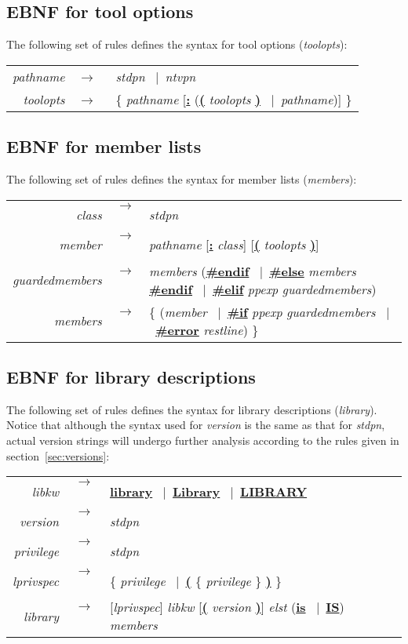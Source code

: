 \documentclass[titlepage,letterpaper]{article}
\newcommand{\nt}[1]{{\it #1}}
\newcommand{\tl}[1]{{\underline{\bf #1}}}
\newcommand{\ar}{$\rightarrow$\ }
\newcommand{\vb}{~$|$~}
\begin{document}
\subsection{EBNF for tool options}

The following set of rules defines the syntax for tool options
(\nt{toolopts}):

\begin{tabular}{rcl}
\nt{pathname} &\ar& \nt{stdpn} \vb \nt{ntvpn} \\
\nt{toolopts} &\ar& \{ \nt{pathname} [\tl{:} (\tl{(} \nt{toolopts} \tl{)} \vb \nt{pathname})] \}
\end{tabular}

\subsection{EBNF for member lists}

The following set of rules defines the syntax for member lists (\nt{members}):

\begin{tabular}{rcl}
\nt{class}          &\ar& \nt{stdpn} \\
\nt{member}         &\ar& \nt{pathname} [\tl{:} \nt{class}] [\tl{(} \nt{toolopts} \tl{)}] \\
\nt{guardedmembers} &\ar& \nt{members} (\tl{\#endif} \vb \tl{\#else} \nt{members} \tl{\#endif} \vb \tl{\#elif} \nt{ppexp} \nt{guardedmembers}) \\
\nt{members}        &\ar& \{ (\nt{member} \vb \tl{\#if} \nt{ppexp}
\nt{guardedmembers} \vb \tl{\#error} \nt{restline}) \} 
\end{tabular}

\subsection{EBNF for library descriptions}

The following set of rules defines the syntax for library descriptions
(\nt{library}).  Notice that although the syntax used for \nt{version}
is the same as that for \nt{stdpn}, actual version strings will
undergo further analysis according to the rules given in
section~\ref{sec:versions}:

\begin{tabular}{rcl}
\nt{libkw}     &\ar& \tl{library} \vb \tl{Library} \vb \tl{LIBRARY} \\
\nt{version}   &\ar& \nt{stdpn} \\
\nt{privilege} &\ar& \nt{stdpn} \\
\nt{lprivspec} &\ar& \{ \nt{privilege} \vb \tl{(} \{ \nt{privilege} \} \tl{)} \} \\
\nt{library}   &\ar& [\nt{lprivspec}] \nt{libkw} [\tl{(} \nt{version} \tl{)}] \nt{elst} (\tl{is} \vb \tl{IS}) \nt{members}
\end{tabular}
\end{document}

